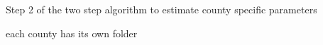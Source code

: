 Step 2 of the two step algorithm to estimate county specific parameters

each county has its own folder 
